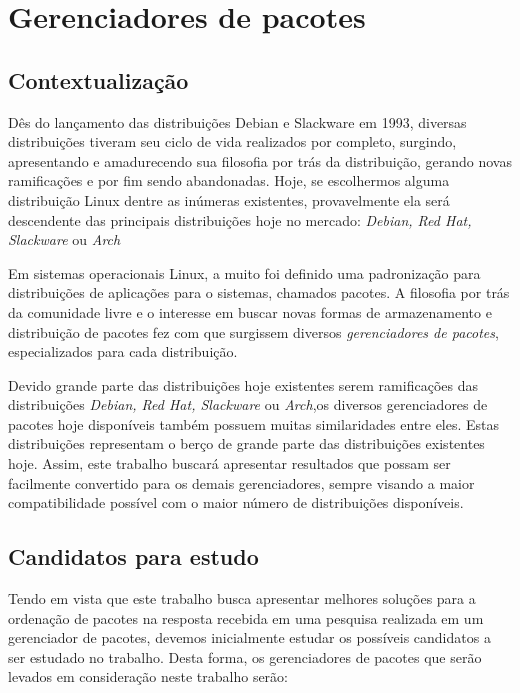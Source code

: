 \section{Gerenciadores de pacotes} %
\label{sec:distribui_es_abordadas}

\subsection{Contextualização} %
\label{sec:breve_descri_o}

Dês do lançamento das distribuições Debian e Slackware em 1993, diversas distribuições tiveram seu ciclo de vida realizados por completo, surgindo, apresentando e amadurecendo sua filosofia por trás da distribuição, gerando novas ramificações e por fim sendo abandonadas. Hoje, se escolhermos alguma distribuição Linux dentre as inúmeras existentes, provavelmente ela será descendente das principais distribuições hoje no mercado: \textit{Debian, Red Hat, Slackware} ou \textit{Arch}

Em sistemas operacionais Linux, a muito foi definido uma padronização para distribuições de aplicações para o sistemas, chamados pacotes. A filosofia por trás da comunidade livre e o interesse em buscar novas formas de armazenamento e distribuição de pacotes fez com que surgissem diversos \textit{gerenciadores de pacotes}, especializados para cada distribuição.

Devido grande parte das distribuições hoje existentes serem ramificações das distribuições \textit{Debian, Red Hat, Slackware} ou \textit{Arch},os diversos gerenciadores de pacotes hoje disponíveis também possuem muitas similaridades entre eles.
Estas distribuições representam o berço de grande parte das distribuições existentes hoje. Assim, este trabalho buscará apresentar resultados que possam ser facilmente convertido para os demais gerenciadores, sempre visando a maior compatibilidade possível com o maior número de distribuições disponíveis.

\subsection{Candidatos para estudo} %
\label{sec:candidatos_para_estudo}

Tendo em vista que este trabalho busca apresentar melhores soluções para a ordenação de pacotes na resposta recebida em uma pesquisa realizada em um gerenciador de pacotes, devemos inicialmente estudar os possíveis candidatos a ser estudado no trabalho.
Desta forma, os gerenciadores de pacotes que serão levados em consideração neste trabalho serão:

